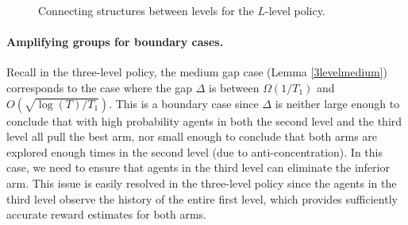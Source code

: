 \begin{figure}[H]
\centering
{}
\caption{Connecting structures between levels for the $L$-level policy.}
\label{fig:llevel-connecting}
\end{figure}

\paragraph{Amplifying groups for boundary cases.} Recall in the
three-level policy, the medium gap case (Lemma \ref{3levelmedium})
corresponds to the case where the gap $\Delta$ is between
$\Omega\left({{1}/{T_1}}\right)$ and
$O\left(\sqrt{{\log(T)}/{T_1}}\right)$. This is a boundary case since
$\Delta$ is neither large enough to conclude that with high
probability agents in both the second level and the third level all
pull the best arm, nor small enough to conclude that both arms are
explored enough times in the second level (due to
anti-concentration). In this case, we need to ensure that agents in
the third level can eliminate the inferior arm. This issue is easily
resolved in the three-level policy since the agents in the third level
observe the history of the entire first level, which provides
sufficiently accurate reward estimates for both arms.

